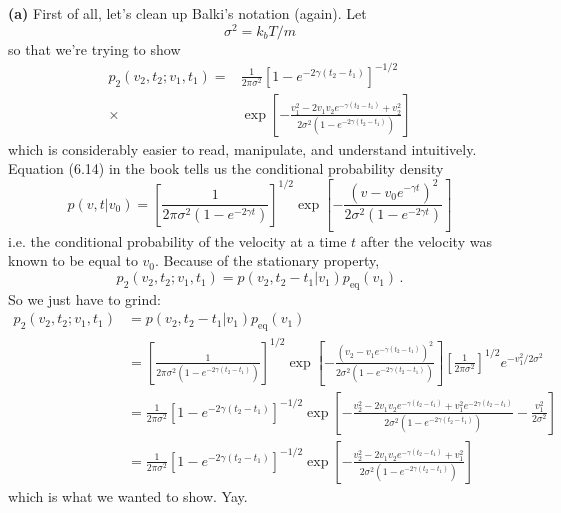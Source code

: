 \textbf{(a)} First of all, let's clean up Balki's notation (again).
Let
\begin{equation*}
  \sigma^2 = k_b T / m
\end{equation*}
so that we're trying to show
\begin{align*}
  p_2(v_2, t_2 ; v_1, t_1)
  =&
    \frac{1}{2\pi \sigma^2} \left[ 1 - e^{-2 \gamma (t_2 - t_1)}  \right]^{-1/2} \\
  \times & \exp \left[
    - \frac{v_1^2 - 2 v_1 v_2 e^{-\gamma (t_2 - t_1)} + v_2^2}{2 \sigma^2 \left( 1 - e^{-2\gamma (t_2 - t_1)} \right)}
  \right]
\end{align*}
which is considerably easier to read, manipulate, and understand intuitively.
Equation (6.14) in the book tells us the conditional probability density
\begin{equation*}
  p(v, t | v_0)
  = \left[ \frac{1}{2\pi \sigma^2 (1 - e^{-2\gamma t})} \right]^{1/2}
  \exp \left[ - \frac{( v - v_0 e^{-\gamma t})^2}{2 \sigma^2 ( 1 - e^{-2 \gamma t})} \right]
\end{equation*}
i.e. the conditional probability of the velocity at a time $t$ after the velocity was known to be equal to $v_0$.
Because of the stationary property,
\begin{equation*}
  p_2(v_2, t_2 ; v_1, t_1) = p(v_2, t_2 - t_1 | v_1) p_\text{eq}(v_1)\, .
\end{equation*}
So we just have to grind:
\begin{align*}
  p_2(v_2, t_2 ; v_1, t_1)
  &= p(v_2, t_2 - t_1 | v_1) p_\text{eq}(v_1)\\
  &= \left[ \frac{1}{2\pi \sigma^2 (1 - e^{-2\gamma (t_2 - t_1)})} \right]^{1/2}
  \exp \left[ - \frac{( v_2 - v_1 e^{-\gamma (t_2 - t_1)})^2}{2 \sigma^2 ( 1 - e^{-2 \gamma (t_2 - t_1)})} \right]
  \left[ \frac{1}{2\pi \sigma^2} \right]^{1/2} e^{-v_1^2 / 2 \sigma^2} \\
  &= \frac{1}{2\pi \sigma^2}
  \left[ 1 - e^{-2 \gamma (t_2 - t_1)} \right] ^{-1/2}
  \exp \left[
    - \frac{v_2^2 - 2 v_1 v_2 e^{-\gamma (t_2 - t_1)} + v_1^2 e^{-2 \gamma (t_2 - t_1)}}{2 \sigma^2 (1 - e^{-2 \gamma (t_2 - t_1)})} - \frac{v_1^2}{2 \sigma^2}
  \right] \\
  &= \frac{1}{2\pi \sigma^2}
  \left[ 1 - e^{-2 \gamma (t_2 - t_1)} \right] ^{-1/2}
  \exp \left[
    - \frac{v_2^2 - 2 v_1 v_2 e^{-\gamma (t_2 - t_1)} + v_1^2}{2 \sigma^2 (1 - e^{-2 \gamma (t_2 - t_1)})}
  \right]
\end{align*}
which is what we wanted to show.
Yay.

